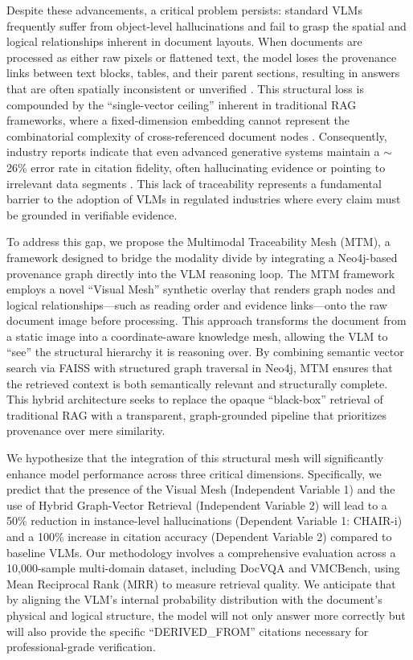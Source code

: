 \documentclass[11pt]{article}
\begin{document}
Despite these advancements, a critical problem persists: standard VLMs frequently suffer from object-level hallucinations and fail to grasp the spatial and logical relationships inherent in document layouts. When documents are processed as either raw pixels or flattened text, the model loses the provenance links between text blocks, tables, and their parent sections, resulting in answers that are often spatially inconsistent or unverified \citep{Fabbri2024}. This structural loss is compounded by the ``single-vector ceiling'' inherent in traditional RAG frameworks, where a fixed-dimension embedding cannot represent the combinatorial complexity of cross-referenced document nodes \citep{DeepMind2025}. Consequently, industry reports indicate that even advanced generative systems maintain a $\sim$26\% error rate in citation fidelity, often hallucinating evidence or pointing to irrelevant data segments \citep{CiteFix2025}. This lack of traceability represents a fundamental barrier to the adoption of VLMs in regulated industries where every claim must be grounded in verifiable evidence.

To address this gap, we propose the Multimodal Traceability Mesh (MTM), a framework designed to bridge the modality divide by integrating a Neo4j-based provenance graph directly into the VLM reasoning loop. The MTM framework employs a novel ``Visual Mesh'' synthetic overlay that renders graph nodes and logical relationships---such as reading order and evidence links---onto the raw document image before processing. This approach transforms the document from a static image into a coordinate-aware knowledge mesh, allowing the VLM to ``see'' the structural hierarchy it is reasoning over. By combining semantic vector search via FAISS with structured graph traversal in Neo4j, MTM ensures that the retrieved context is both semantically relevant and structurally complete. This hybrid architecture seeks to replace the opaque ``black-box'' retrieval of traditional RAG with a transparent, graph-grounded pipeline that prioritizes provenance over mere similarity.

We hypothesize that the integration of this structural mesh will significantly enhance model performance across three critical dimensions. Specifically, we predict that the presence of the Visual Mesh (Independent Variable 1) and the use of Hybrid Graph-Vector Retrieval (Independent Variable 2) will lead to a 50\% reduction in instance-level hallucinations (Dependent Variable 1: CHAIR-i) and a 100\% increase in citation accuracy (Dependent Variable 2) compared to baseline VLMs. Our methodology involves a comprehensive evaluation across a 10,000-sample multi-domain dataset, including DocVQA and VMCBench, using Mean Reciprocal Rank (MRR) to measure retrieval quality. We anticipate that by aligning the VLM’s internal probability distribution with the document’s physical and logical structure, the model will not only answer more correctly but will also provide the specific ``DERIVED\_FROM'' citations necessary for professional-grade verification.
\end{document}
